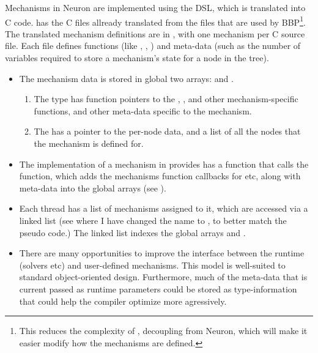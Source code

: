 \noindent
Mechanisms in Neuron are implemented using the  DSL, which is translated into C code.
\neuron has the C files allready translated from the \hoc files that are used by BBP\footnote{This reduces the complexity of \neuron, decoupling \neuron from Neuron, which will make it easier modify how the mechanisms are defined.}.
The translated mechanism definitions are in , with one mechanism per C source file.
Each file defines functions (like , , ) and meta-data (such as the number of variables required to store a mechanism's state for a node in the tree).
\begin{itemize}
\item
    The mechanism data is stored in global two arrays:  and .
    \begin{enumerate}
    \item
        The  type has function pointers to the , ,  and other mechanism-specific functions, and other meta-data specific to the mechanism.
    \item
        The  has a pointer to the per-node data, and a list of all the nodes that the mechanism is defined for.
    \end{enumerate}
\item
    The implementation of a mechanism in  provides has a function  that calls the  function, which adds the mechanisms function callbacks for  etc, along with meta-data into the global arrays (see ).
\item
    Each thread has a list of mechanisms assigned to it, which are accessed via a linked list  (see  where I have changed the name  to , to better match the pseudo code.) The linked list indexes the global arrays  and  .
\item
    There are many opportunities to improve the interface between the runtime (solvers etc) and user-defined mechanisms.
    This model is well-suited to standard object-oriented design.
    Furthermore, much of the meta-data that is current passed as runtime parameters could be stored as type-information that could help the compiler optimize more agressively.
\end{itemize}

